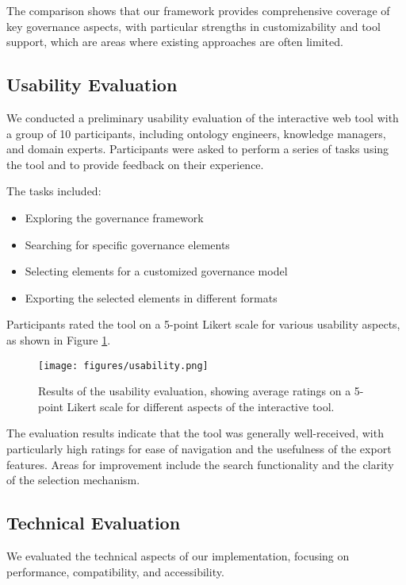 \documentclass[conference]{IEEEtran}
\begin{document}
The comparison shows that our framework provides comprehensive coverage of key governance aspects, with particular strengths in customizability and tool support, which are areas where existing approaches are often limited.

\subsection{Usability Evaluation}

We conducted a preliminary usability evaluation of the interactive web tool with a group of 10 participants, including ontology engineers, knowledge managers, and domain experts. Participants were asked to perform a series of tasks using the tool and to provide feedback on their experience.

The tasks included:
\begin{itemize}
    \item Exploring the governance framework
    \item Searching for specific governance elements
    \item Selecting elements for a customized governance model
    \item Exporting the selected elements in different formats
\end{itemize}

Participants rated the tool on a 5-point Likert scale for various usability aspects, as shown in Figure \ref{fig:usability}.

\begin{figure}[htbp]
\centerline{\texttt{[image: figures/usability.png]}}
\caption{Results of the usability evaluation, showing average ratings on a 5-point Likert scale for different aspects of the interactive tool.}
\label{fig:usability}
\end{figure}

The evaluation results indicate that the tool was generally well-received, with particularly high ratings for ease of navigation and the usefulness of the export features. Areas for improvement include the search functionality and the clarity of the selection mechanism.

\subsection{Technical Evaluation}

We evaluated the technical aspects of our implementation, focusing on performance, compatibility, and accessibility.
\end{document}
